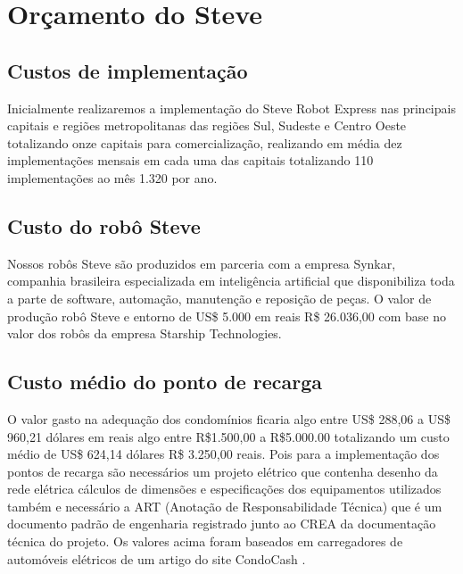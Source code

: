 \chapter{Orçamento do Steve}
\label{ch:identificador}

\section{Custos de implementação}
Inicialmente realizaremos a implementação do Steve Robot Express nas principais capitais e regiões metropolitanas das regiões Sul, Sudeste e Centro Oeste totalizando onze capitais para comercialização, realizando em média dez implementações mensais em cada uma das capitais totalizando 110 implementações ao mês 1.320 por ano.

\section{Custo do robô Steve}
Nossos robôs Steve são produzidos em parceria com a empresa Synkar,
companhia brasileira especializada em inteligência artificial que disponibiliza toda a parte de software, automação, manutenção e reposição de peças. O valor de produção robô Steve e entorno de US\$ 5.000 em reais R\$ 26.036,00 com base no valor dos robôs da empresa Starship Technologies.

\section{Custo médio do ponto de recarga}
O valor gasto na adequação dos condomínios ficaria algo entre US\$ 288,06 a US\$ 960,21 dólares em reais algo entre R\$1.500,00 a R\$5.000.00 totalizando um custo médio de US\$ 624,14 dólares R\$ 3.250,00 reais. Pois para a implementação dos pontos de recarga são necessários um projeto elétrico que contenha desenho da rede elétrica cálculos de dimensões e especificações dos equipamentos utilizados também e necessário a ART (Anotação de Responsabilidade Técnica) que é um documento padrão de engenharia registrado junto ao CREA da documentação técnica do projeto. Os valores acima foram baseados em carregadores de automóveis elétricos de um artigo do site CondoCash \cite{CondoCash}.

